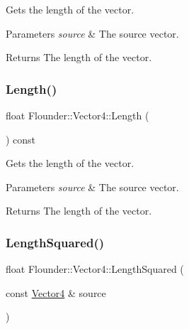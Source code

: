Gets the length of the vector. 


\begin{DoxyParams}{Parameters}
{\em source} & The source vector. \\
\hline
\end{DoxyParams}
\begin{DoxyReturn}{Returns}
The length of the vector. 
\end{DoxyReturn}
\mbox{\label{class_flounder_1_1_vector4_ad3eeab8d1e45aa98df0321b148c791c8}} 
\subsubsection{\texorpdfstring{Length()}{Length()}\hspace{0.1cm}{\footnotesize\ttfamily [2/2]}}
{\footnotesize\ttfamily float Flounder\+::\+Vector4\+::\+Length (\begin{DoxyParamCaption}{ }\end{DoxyParamCaption}) const}



Gets the length of the vector. 


\begin{DoxyParams}{Parameters}
{\em source} & The source vector. \\
\hline
\end{DoxyParams}
\begin{DoxyReturn}{Returns}
The length of the vector. 
\end{DoxyReturn}
\mbox{\label{class_flounder_1_1_vector4_aa79739bf79c023aad3ad49ddf5c7e6f2}} 
\subsubsection{\texorpdfstring{Length\+Squared()}{LengthSquared()}\hspace{0.1cm}{\footnotesize\ttfamily [1/2]}}
{\footnotesize\ttfamily float Flounder\+::\+Vector4\+::\+Length\+Squared (\begin{DoxyParamCaption}\item[{const \hyperlink{class_flounder_1_1_vector4}{Vector4} \&}]{source }\end{DoxyParamCaption})\hspace{0.3cm}{\ttfamily [static]}}



